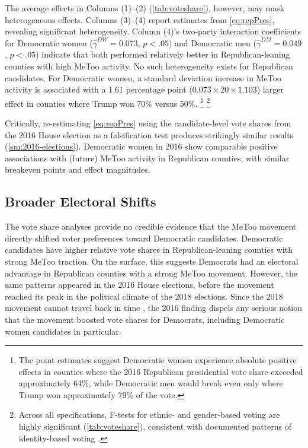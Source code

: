 \documentclass[manuscript,screen,nonacm,11pt,acm]{acmart}
\newcommand{\R}{Republican}
\begin{document}
The average effects in Columns (1)--(2) (\cref{tab:voteshare}), however, may mask heterogeneous effects.
Columns (3)--(4) report estimates from \cref{eq:repPres}, revealing significant heterogeneity.
Column (4)'s two-party interaction coefficients for Democratic women ($\hat{\gamma}^{DW} = 0.073$, $p < .05$) and Democratic men ($\hat{\gamma}^{DM} = 0.049$, $p < .05$) indicate that both performed relatively better in Republican-leaning counties with high MeToo activity.
No such heterogeneity exists for Republican candidates.
For Democratic women, a standard deviation increase in MeToo activity is associated with a 1.61 percentage point ($0.073 \times 20 \times 1.103$) larger effect in counties where Trump won 70\% versus 50\%.%
\footnote{The point estimates suggest Democratic women experience absolute positive effects in counties where the 2016 Republican presidential vote share exceeded approximately 64\%, while Democratic men would break even only where Trump won approximately 79\% of the vote.}
\footnote{Across all specifications, F-tests for ethnic- and gender-based voting are highly significant (\cref{tab:voteshare}), consistent with documented patterns of identity-based voting \citep[e.g.,][]{Abrajano2005, Flanagan2018, HOLLI2010, Matsubayashi2011, Stephens-Davidowitz2014}.}

Critically, re-estimating \cref{eq:repPres} using the candidate-level vote shares from the 2016 House election as a falsification test produces strikingly similar results (\cref{sm:2016-elections}).
Democratic women in 2016 show comparable positive associations with (future) MeToo activity in Republican counties, with similar breakeven points and effect magnitudes.%

\subsection{Broader Electoral Shifts}
\label{sec:voteshare-discussion}

The vote share analyses provide no credible evidence that the MeToo movement directly shifted voter preferences toward Democratic candidates.
Democratic candidates have higher relative vote shares in \R{}-leaning counties with strong MeToo traction.
On the surface, this suggests Democrats had an electoral advantage in Republican counties with a strong MeToo movement.
However, the same patterns appeared in the 2016 House elections, before the movement reached its peak in the political climate of the 2018 elections.
Since the 2018 movement cannot travel back in time \citep{trumpcomment}, the 2016 finding dispels any serious notion that the movement boosted vote shares for Democrats, including Democratic women candidates in particular.
\end{document}
